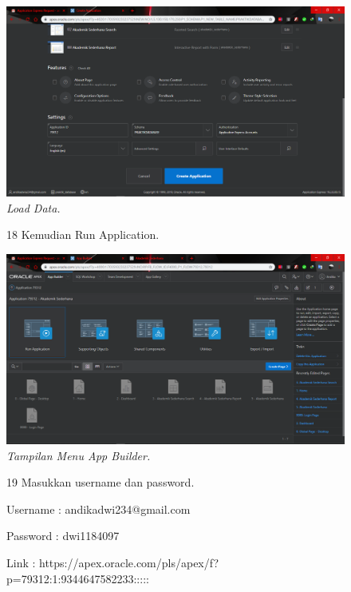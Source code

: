 \begin{enumerate}
\begin{figure}
    \begin{center}
\includegraphics[scale=0.2]{figures/7.png}
    \caption{\textit{Load Data.}}
        \end{center}
\label{gambar}
\end{figure}

\begin{figure}
\item[18] Kemudian Run Application.

    \begin{center}
\includegraphics[scale=0.2]{figures/8.png}
    \caption{\textit{Tampilan Menu App Builder.}}
        \end{center}
\label{gambar}
\end{figure}


\begin{figure}
\item[19]Masukkan username dan password.
\item[] Username : andikadwi234@gmail.com
\item[] Password : dwi1184097
\item[] Link : https://apex.oracle.com/pls/apex/f?p=79312:1:9344647582233:::::


\end{figure}
\end{enumerate}
